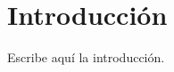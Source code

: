 \documentclass[../main.tex]{subfiles}
\begin{document}
\chapter{Introducción}

Escribe aquí la introducción.
\end{document}
